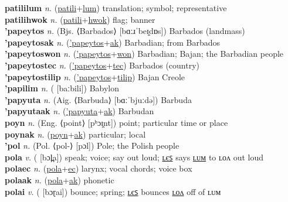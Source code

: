 \textbf{patililum} \textit{n.} (\hyperref[patili]{patili}+\hyperref[lum]{lum})
translation; symbol; representative \label{patililum} \\
\textbf{patilihwok} \textit{n.} (\hyperref[patili]{patili}+\hyperref[hwok]{hwok})
flag; banner \label{patilihwok} \\
\textbf{'papeytos} \textit{n.} (Bjs. ⟨Barbados⟩ [bɑːɹˈbeɪ̯dɒs])
Barbados (landmass) \label{'papeytos} \\
\textbf{'papeytosak} \textit{n.} (\hyperref['papeytos]{'papeytos}+\hyperref[ak]{ak})
Barbadian; from Barbados \label{'papeytosak} \\
\textbf{'papeytoswon} \textit{n.} (\hyperref['papeytos]{'papeytos}+\hyperref[won]{won})
Barbadian; Bajan; the Barbadian people \label{'papeytoswon} \\
\textbf{'papeytostec} \textit{n.} (\hyperref['papeytos]{'papeytos}+\hyperref[tec]{tec})
Barbados (country) \label{'papeytostec} \\
\textbf{'papeytostilip} \textit{n.} (\hyperref['papeytos]{'papeytos}+\hyperref[tilip]{tilip})
Bajan Creole \label{'papeytostilip} \\
\textbf{'papilim} \textit{n.} ( [baːbili])
Babylon \label{'papilim} \\
\textbf{'papyuta} \textit{n.} (Aig. ⟨Barbuda⟩ [bɑːˈbjuːdə])
Barbuda \label{'papyuta} \\
\textbf{'papyutaak} \textit{n.} (\hyperref['papyuta]{'papyuta}+\hyperref[ak]{ak})
Barbudan \label{'papyutaak} \\
\textbf{poyn} \textit{n.} (Eng. ⟨point⟩ [pʰɔɪ̯nt])
point; particular time or place \label{poyn} \\
\textbf{poynak} \textit{n.} (\hyperref[poyn]{poyn}+\hyperref[ak]{ak})
particular; local \label{poynak} \\
\textbf{'pol} \textit{n.} (Pol. ⟨pol-⟩ [pɔl])
Pole; the Polish people \label{'pol} \\
\textbf{pola} \textit{v.} ( [bɔl̪a])
speak; voice; say out loud; \hyperref[polales]{ʟєꜱ} says \hyperref[polalum]{ʟᴜᴍ} to ʟᴏᴧ out loud \label{pola} \\
\textbf{polaec} \textit{n.} (\hyperref[pola]{pola}+\hyperref[ec]{ec})
larynx; vocal chords; voice box \label{polaec} \\
\textbf{polaak} \textit{n.} (\hyperref[pola]{pola}+\hyperref[ak]{ak})
phonetic \label{polaak} \\
\textbf{polai} \textit{v.} ( [bɔɽai])
bounce; spring; \hyperref[polailes]{ʟєꜱ} bounces \hyperref[polailon]{ʟᴏᴧ} off of ʟᴜᴍ \label{polai} \\
